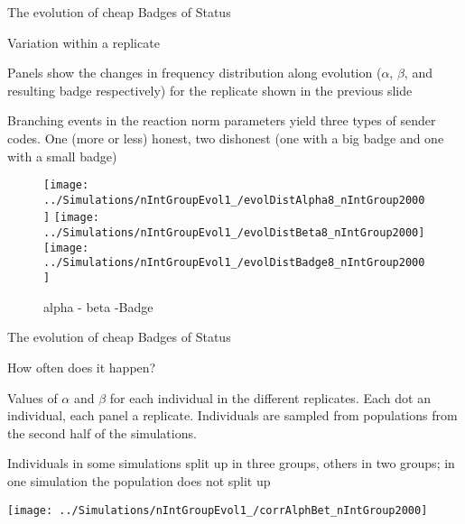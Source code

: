 \documentclass[
  ignorenonframetext,
]{beamer}
\begin{document}
\begin{frame}{The evolution of cheap Badges of Status}
\protect\hypertarget{the-evolution-of-cheap-badges-of-status-2}{}

\begin{block}{Variation within a replicate}

\tiny

Panels show the changes in frequency distribution along evolution
(\(\alpha\), \(\beta\), and resulting badge respectively) for the
replicate shown in the previous slide

Branching events in the reaction norm parameters yield three types of
sender codes. One (more or less) honest, two dishonest (one with a big
badge and one with a small badge)

\begin{figure}

\texttt{[image: ../Simulations/nIntGroupEvol1\_/evolDistAlpha8\_nIntGroup2000]} \texttt{[image: ../Simulations/nIntGroupEvol1\_/evolDistBeta8\_nIntGroup2000]} \texttt{[image: ../Simulations/nIntGroupEvol1\_/evolDistBadge8\_nIntGroup2000]} \hfill{}

\caption{alpha - beta -Badge}\label{fig:unnamed-chunk-23}
\end{figure}

\end{block}

\end{frame}

\begin{frame}{The evolution of cheap Badges of Status}
\protect\hypertarget{the-evolution-of-cheap-badges-of-status-3}{}

\begin{block}{How often does it happen?}

\tiny

Values of \(\alpha\) and \(\beta\) for each individual in the different
replicates. Each dot an individual, each panel a replicate. Individuals
are sampled from populations from the second half of the simulations.

Individuals in some simulations split up in three groups, others in two
groups; in one simulation the population does not split up

\begin{flushleft}\texttt{[image: ../Simulations/nIntGroupEvol1\_/corrAlphBet\_nIntGroup2000]} \end{flushleft}

\end{block}

\end{frame}
\end{document}
